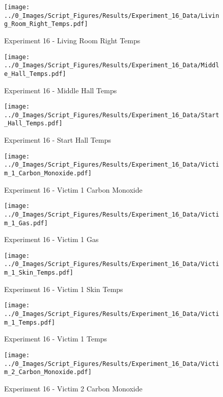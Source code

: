 	\begin{figure}[H]
		\centering
		\texttt{[image: ../0\_Images/Script\_Figures/Results/Experiment\_16\_Data/Living\_Room\_Right\_Temps.pdf]}
		\caption[]{Experiment 16 - Living Room Right Temps}
	\end{figure}
 
	\clearpage

	\begin{figure}[H]
		\centering
		\texttt{[image: ../0\_Images/Script\_Figures/Results/Experiment\_16\_Data/Middle\_Hall\_Temps.pdf]}
		\caption[]{Experiment 16 - Middle Hall Temps}
	\end{figure}
 

	\begin{figure}[H]
		\centering
		\texttt{[image: ../0\_Images/Script\_Figures/Results/Experiment\_16\_Data/Start\_Hall\_Temps.pdf]}
		\caption[]{Experiment 16 - Start Hall Temps}
	\end{figure}
 
	\clearpage

	\begin{figure}[H]
		\centering
		\texttt{[image: ../0\_Images/Script\_Figures/Results/Experiment\_16\_Data/Victim\_1\_Carbon\_Monoxide.pdf]}
		\caption[]{Experiment 16 - Victim 1 Carbon Monoxide}
	\end{figure}
 

	\begin{figure}[H]
		\centering
		\texttt{[image: ../0\_Images/Script\_Figures/Results/Experiment\_16\_Data/Victim\_1\_Gas.pdf]}
		\caption[]{Experiment 16 - Victim 1 Gas}
	\end{figure}
 
	\clearpage

	\begin{figure}[H]
		\centering
		\texttt{[image: ../0\_Images/Script\_Figures/Results/Experiment\_16\_Data/Victim\_1\_Skin\_Temps.pdf]}
		\caption[]{Experiment 16 - Victim 1 Skin Temps}
	\end{figure}
 

	\begin{figure}[H]
		\centering
		\texttt{[image: ../0\_Images/Script\_Figures/Results/Experiment\_16\_Data/Victim\_1\_Temps.pdf]}
		\caption[]{Experiment 16 - Victim 1 Temps}
	\end{figure}
 
	\clearpage

	\begin{figure}[H]
		\centering
		\texttt{[image: ../0\_Images/Script\_Figures/Results/Experiment\_16\_Data/Victim\_2\_Carbon\_Monoxide.pdf]}
		\caption[]{Experiment 16 - Victim 2 Carbon Monoxide}
	\end{figure}
 

